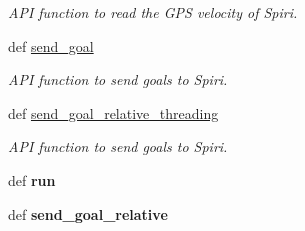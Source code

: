 \begin{DoxyCompactItemize}
\begin{DoxyCompactList}\small\item\em A\-P\-I function to read the G\-P\-S velocity of Spiri. \end{DoxyCompactList}\item 
def \hyperlink{classspiri__api_1_1get__state_1_1_staterobot_af6d1fe436714134bbd2fb78da0b09835}{send\-\_\-goal}
\begin{DoxyCompactList}\small\item\em A\-P\-I function to send goals to Spiri. \end{DoxyCompactList}\item 
def \hyperlink{classspiri__api_1_1get__state_1_1_staterobot_abc35e5157bb27bfc35bbfb4aee9df2e5}{send\-\_\-goal\-\_\-relative\-\_\-threading}
\begin{DoxyCompactList}\small\item\em A\-P\-I function to send goals to Spiri. \end{DoxyCompactList}\item 
\hypertarget{classspiri__api_1_1get__state_1_1_staterobot_aa856b1aa2607851f713326fa98aae62f}{def {\bfseries run}}\label{classspiri__api_1_1get__state_1_1_staterobot_aa856b1aa2607851f713326fa98aae62f}

\item 
\hypertarget{classspiri__api_1_1get__state_1_1_staterobot_a26b9c2b42ed90baf83a4b955c5fd8e1c}{def {\bfseries send\-\_\-goal\-\_\-relative}}\label{classspiri__api_1_1get__state_1_1_staterobot_a26b9c2b42ed90baf83a4b955c5fd8e1c}

\end{DoxyCompactItemize}

